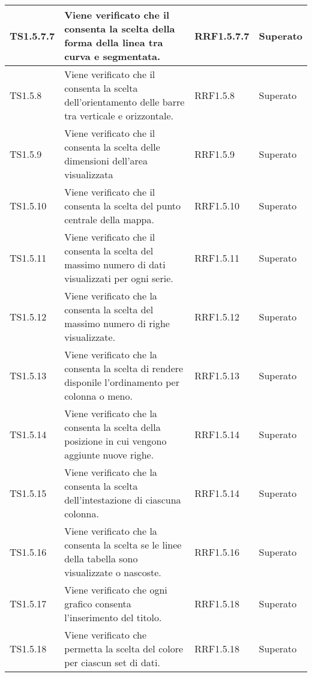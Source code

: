 \begin{longtabu}{| X[0.5] | X | X[0.5] | X[0.4] |}
TS1.5.7.7 &	Viene verificato che il  consenta la scelta della forma della linea tra curva e segmentata. & RRF1.5.7.7 & Superato\\ \hline

TS1.5.8 & Viene verificato che il  consenta la scelta dell'orientamento delle barre tra verticale e orizzontale. & RRF1.5.8 & Superato\\ \hline

TS1.5.9 & Viene verificato che il  consenta la scelta delle dimensioni dell'area visualizzata & RRF1.5.9 & Superato\\ \hline

TS1.5.10 & Viene verificato che il  consenta la scelta del punto centrale della mappa. & RRF1.5.10 & Superato\\ \hline

TS1.5.11 &	Viene verificato che il  consenta la scelta del massimo numero di dati visualizzati per ogni serie. & RRF1.5.11 & Superato\\ \hline

TS1.5.12 & Viene verificato che la  consenta la scelta del massimo numero di righe visualizzate. & RRF1.5.12 & Superato\\ \hline

TS1.5.13 &	Viene verificato che la  consenta la scelta di rendere disponile l'ordinamento per colonna o meno. & RRF1.5.13 & Superato\\ \hline

TS1.5.14 & Viene verificato che la  consenta la scelta della posizione in cui vengono aggiunte nuove righe. & RRF1.5.14 & Superato\\ \hline

TS1.5.15 & Viene verificato che la  consenta la scelta dell'intestazione di ciascuna colonna. & RRF1.5.14 & Superato\\ \hline
 
TS1.5.16 & Viene verificato che la  consenta la scelta se le linee della tabella sono visualizzate o nascoste. & RRF1.5.16 & Superato\\ \hline

TS1.5.17 & Viene verificato che ogni grafico consenta l'inserimento del titolo. & RRF1.5.18 & Superato\\ \hline

TS1.5.18 & Viene verificato che  permetta la scelta del colore per ciascun set di dati. & RRF1.5.18 & Superato\\ \hline


\end{longtabu}
